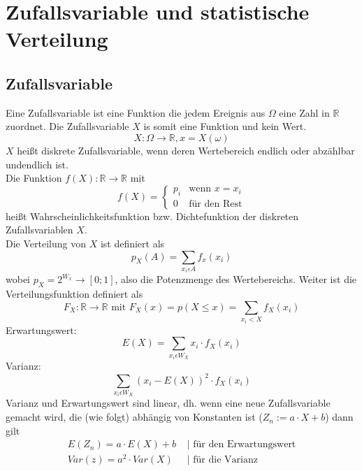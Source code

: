 \documentclass[a4paper]{scrartcl}
\begin{document}
    \section{Zufallsvariable und statistische Verteilung}
        \subsection{Zufallsvariable}
            Eine Zufallsvariable ist eine Funktion die jedem Ereignis aus \(\Omega\) eine Zahl in \(\mathbb{R}\) zuordnet. Die Zufallsvariable \(X\) is somit eine Funktion und kein Wert.
            \begin{equation*}
                X: \Omega \rightarrow \mathbb{R}, x=X(\omega)
            \end{equation*}
            \(X\) heißt diskrete Zufallsvariable, wenn deren Wertebereich endlich oder abzählbar undendlich ist. \\
            Die Funktion  \(f(X): \mathbb{R} \rightarrow \mathbb{R}\) mit 
            \[f(X)=
                \begin{cases}
                    p_i & \text{wenn } x=x_i\\
                    0 & \text{für den Rest} 
                \end{cases}
            \] 
            heißt Wahrscheinlichkeitsfunktion bzw. Dichtefunktion der diskreten Zufallsvariablen \(X\). \\
            Die Verteilung von \(X\) ist definiert als 
            \begin{equation*}
                p_X(A) = \sum\limits_{x_i \varepsilon A} f_x(x_i)
            \end{equation*}
            wobei \(p_X = 2^{W_x} \rightarrow [0;1] \), also die Potenzmenge des Wertebereichs. Weiter ist die Verteilungsfunktion definiert als 
            \begin{equation*}
                F_X: \mathbb{R} \rightarrow \mathbb{R} \text{ mit } F_X (x) = p(X \le x) = \sum\limits_{x_i < X} f_X(x_i)
            \end{equation*}
            Erwartungswert:
            \begin{equation*}
                E(X) = \sum\limits_{x_i \epsilon W_X} x_i \cdot f_X (x_i)
            \end{equation*}
            Varianz:
            \begin{equation*}
                \sum\limits_{x_i \epsilon W_X} (x_i - E(X))^2 \cdot f_X(x_i)
            \end{equation*}
            Varianz und Erwartungswert sind linear, dh. wenn eine neue Zufallsvariable gemacht wird, die (wie folgt) abhängig von Konstanten ist (\(Z_n := a \cdot X + b\)) dann gilt
            \begin{equation*}
                \begin{aligned}
                    E(Z_n) = a \cdot E(X) + b & \text{ | für den Erwartungswert}\\
                    Var(z) = a^2 \cdot Var(X) & \text{ | für die Varianz}
                \end{aligned}
            \end{equation*}  
\end{document}
